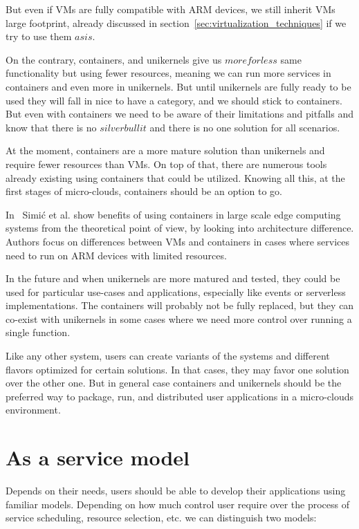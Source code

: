 But even if VMs are fully compatible with ARM devices, we still inherit VMs large footprint, already discussed in section~\ref{sec:virtualization_techniques} if we try to use them $as is$.

On the contrary, containers, and unikernels give us $more for less$ same functionality but using fewer resources, meaning we can run more services in containers and even more in unikernels. But until unikernels are fully ready to be used they will fall in nice to have a category, and we should stick to containers. But even with containers we need to be aware of their limitations and pitfalls and know that there is no $silver bullit$ and there is no one solution for all scenarios.

At the moment, containers are a more mature solution than unikernels and require fewer resources than VMs. On top of that, there are numerous tools already existing using containers that could be utilized. Knowing all this, at the first stages of micro-clouds, containers should be an option to go. 

In~\cite{inproceedingsSimic3} Simi\' c et al. show benefits of using containers in large scale edge computing systems from the theoretical point of view, by looking into architecture difference. Authors focus on differences between VMs and containers in cases where services need to run on ARM devices with limited resources.

In the future and when unikernels are more matured and tested, they could be used for particular use-cases and applications, especially like events or serverless implementations. The containers will probably not be fully replaced, but they can co-exist with unikernels in some cases where we need more control over running a single function.

Like any other system, users can create variants of the systems and different flavors optimized for certain solutions. In that cases, they may favor one solution over the other one. But in general case containers and unikernels should be the preferred way to package, run, and distributed user applications in a micro-clouds environment.
%
%
\section{As a service model}\label{sec:as_a_service_model}
%
Depends on their needs, users should be able to develop their applications using familiar models. Depending on how much control user require over the process of service scheduling, resource selection, etc. we can distinguish two models:
 
